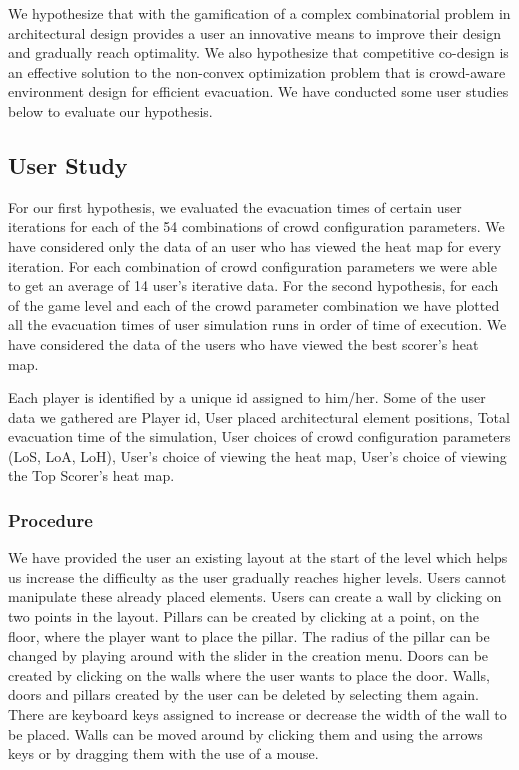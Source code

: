 We hypothesize that with the gamification of a complex combinatorial problem in architectural design provides a user an innovative means to improve their design and gradually reach optimality. We also hypothesize that competitive co-design is an effective solution to the non-convex optimization problem that is crowd-aware environment design for efficient evacuation. We have conducted some user studies below to evaluate our hypothesis.

\subsection{User Study}
For our first hypothesis, we evaluated the evacuation times of certain user iterations for each of the 54 combinations of crowd configuration parameters. We have considered only the data of an user who has viewed the heat map for every iteration. For each combination of crowd configuration parameters we were able to get an average of 14 user's iterative data. For the second hypothesis, for each of the game level and each of the crowd parameter combination we have plotted all the evacuation times of user simulation runs in order of time of execution. We have considered the data of the users who have viewed the best scorer's heat map. 

Each player is identified by a unique id assigned to him/her. Some of the user data we gathered are Player id, User placed architectural element positions, Total evacuation time of the simulation, User choices of crowd configuration parameters (LoS, LoA, LoH), User's choice of viewing the heat map, User's choice of viewing the Top Scorer's heat map. 

\subsubsection{Procedure}
We have provided the user an existing layout at the start of the level which helps us increase the difficulty as the user gradually reaches higher levels. Users cannot manipulate these already placed elements. Users can create a wall by clicking on two points in the layout. Pillars can be created by clicking at a point, on the floor, where the player want to place the pillar. The radius of the pillar can be changed by playing around with the slider in the creation menu. Doors can be created by clicking on the walls where the user wants to place the door. Walls, doors and pillars created by the user can be deleted by selecting them again. There are keyboard keys assigned to increase or decrease the width of the wall to be placed. Walls can be moved around by clicking them and using the arrows keys or by dragging them with the use of a mouse.

